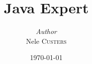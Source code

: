 \documentclass[a4paper, 12pt]{report}
\institute{Hogeschool PXL}
\title{Java Expert}
\author{\textit{Author}\\Nele \textsc{Custers}}
\date{\today}
\begin{document}
    \maketitle
    \romantableofcontents
    






\printbibliography
\end{document}
